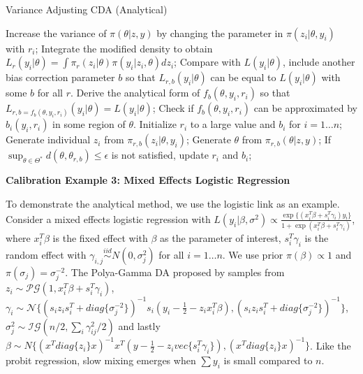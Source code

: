 \documentclass[10pt]{article}
\newcommand{\xbeta}{ x_i^T \beta}
\begin{document}
\begin{algorithm}[H]
		\caption{Variance Adjusting CDA (Analytical)}
		\label{numerical_cda}
		    \begin{algorithmic}
			\State Increase the variance of $\pi(\theta| z,y)$ by changing the parameter in $\pi(z_i |\theta,y_i)$ with $r_i$;
		\State Integrate the modified density to obtain $L_r(y_i|\theta)= \int \pi_r (z_i|\theta) \pi(y_i|z_i,\theta) d z_i$; 
		\State Compare with $L(y_i|\theta)$, include another bias correction parameter $b$ so that $L_{r,b}(y_i|\theta)$ can be equal to $L(y_i|\theta)$ with some $b$ for all $r$.
		\State Derive the analytical form of $f_b(\theta,y_i,r_i)$ so that $L_{r,b={f_b(\theta,y_i,r_i)}}(y_i|\theta)=L(y_i|\theta)$;
		\State Check if $f_b(\theta,y_i,r_i)$ can be approximated by $b_i(y_i,r_i)$ in some region of $\theta$.
		\State Initialize $r_i$ to a large value and $b_i$  for $i=1\ldots n$;
		\State {}
		\State Generate individual $z_i$ from $\pi_{r,b}(z_i|\theta, y_i)$;
		\State Generate $\theta$ from $\pi_{r,b}(\theta|z, y)$;
		\State If  $ \sup_{\theta \in \varTheta^*} d(\theta, \theta_{r,b})\le \epsilon$ is not satisfied, update $r_i$ and $b_i$;
		\EndFor
		\end{algorithmic}
\end{algorithm}


{\bf Calibration Example 3: Mixed Effects Logistic Regression}

To demonstrate the analytical method, we use the logistic link as an example. Consider a mixed effects logistic regression with  $L(y_i|\beta, \sigma^2)\propto \frac{\exp\{ (\xbeta+s_i^T\gamma_i) y_i \} }{1+ \exp(\xbeta+s_i^T\gamma_i)}$, where $\xbeta$ is the fixed effect with $\beta$ as the parameter of interest, $s_i^T\gamma_i$ is the random effect with $\gamma_{i,j} \stackrel{iid}{\sim} N(0, \sigma_j^2)$ for all $i=1\ldots n$. We use prior $\pi(\beta)\propto 1$ and $\pi(\sigma_j)=\sigma_j^{-2}$. The Polya-Gamma DA proposed by \cite{polson2013bayesian} samples from $z_i\sim \mathcal{PG}(1, \xbeta+s_i^T\gamma_i)$, $\gamma_i \sim \mathcal{N}\{  (s_i z_i s_i^T   + diag\{\sigma_j^{-2}\}  )^{-1}   s_i  (y_i-\frac{1}{2} - z_i \xbeta)  ,  (s_i z_i s_i^T   + diag\{\sigma_j^{-2}\}  )^{-1}   \}$, $\sigma_j^{2}\sim \mathcal{IG}(n/2, \sum_i \gamma_{ij}^2/2)$ and lastly $\beta \sim N\{  (x^T diag\{z_i\}x)^{-1}   x^T  (y-\frac{1}{2} -  z_i vec \{ s_i^T\gamma_i \})  ,  (x^T diag\{z_i\}x)^{-1}   \}$. Like the probit regression, slow mixing emerges when $\sum y_i$ is small compared to $n$.
\end{document}

